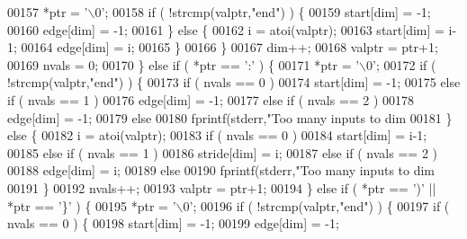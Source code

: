 \begin{DoxyCode}
00157                 *ptr = \textcolor{charliteral}{'\(\backslash\)0'};
00158                  \textcolor{keywordflow}{if} ( !strcmp(valptr,\textcolor{stringliteral}{"end"}) ) \{
00159                      start[dim] = -1;
00160                      edge[dim]  = -1;
00161                  \} \textcolor{keywordflow}{else} \{
00162                      i = atoi(valptr);
00163                      start[dim] = i-1;
00164                      edge[dim]  = i;
00165                  \}
00166             \}
00167             dim++;
00168             valptr = ptr+1;
00169             nvals = 0;
00170         \} \textcolor{keywordflow}{else} \textcolor{keywordflow}{if} ( *ptr == \textcolor{charliteral}{':'} ) \{
00171             *ptr = \textcolor{charliteral}{'\(\backslash\)0'};
00172             \textcolor{keywordflow}{if} ( !strcmp(valptr,\textcolor{stringliteral}{"end"}) ) \{
00173                 \textcolor{keywordflow}{if} ( nvals == 0 )
00174                     start[dim] = -1;
00175                 \textcolor{keywordflow}{else} \textcolor{keywordflow}{if} ( nvals == 1 )
00176                     edge[dim] = -1;
00177                 \textcolor{keywordflow}{else} \textcolor{keywordflow}{if} ( nvals == 2 )
00178                     edge[dim] = -1;
00179                 \textcolor{keywordflow}{else}
00180                     fprintf(stderr,\textcolor{stringliteral}{"Too many inputs to dim %
00181             \} \textcolor{keywordflow}{else} \{
00182                 i = atoi(valptr);
00183                 \textcolor{keywordflow}{if} ( nvals == 0 )
00184                     start[dim] = i-1;
00185                 \textcolor{keywordflow}{else} \textcolor{keywordflow}{if} ( nvals == 1 )
00186                     stride[dim] = i;
00187                 \textcolor{keywordflow}{else} \textcolor{keywordflow}{if} ( nvals == 2 )
00188                     edge[dim] = i;
00189                 \textcolor{keywordflow}{else}
00190                     fprintf(stderr,\textcolor{stringliteral}{"Too many inputs to dim %
00191             \}
00192             nvals++;
00193             valptr = ptr+1;
00194         \} \textcolor{keywordflow}{else} \textcolor{keywordflow}{if} ( *ptr == \textcolor{charliteral}{')'} || *ptr == \textcolor{charliteral}{'\}'} ) \{
00195             *ptr = \textcolor{charliteral}{'\(\backslash\)0'};
00196             \textcolor{keywordflow}{if} ( !strcmp(valptr,\textcolor{stringliteral}{"end"}) ) \{
00197                 \textcolor{keywordflow}{if} ( nvals == 0 ) \{
00198                     start[dim] = -1;
00199                     edge[dim]  = -1;
}}
\end{DoxyCode}
